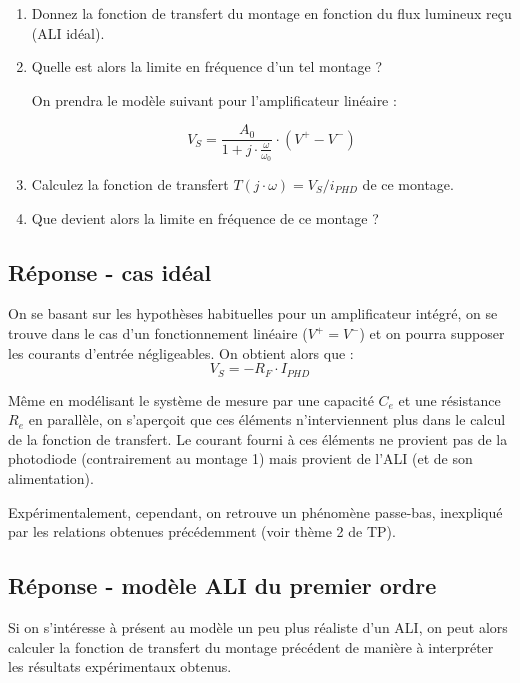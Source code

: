 \begin{enumerate}
	\item Donnez la fonction de transfert du montage en fonction du flux lumineux reçu (ALI idéal).
	\item Quelle est alors la limite en fréquence d'un tel montage ?
	
	\bigskip
	
	On prendra le modèle suivant pour l'amplificateur linéaire :

$$V_S = \frac{A_0}{1 + j \cdot \frac{\omega}{\omega_0}} \cdot (V^+ - V^-)$$
	
	\item Calculez la fonction de transfert $T(j\cdot \omega) = V_S /  i_{PHD}$ de ce montage.
	\item Que devient alors la limite en fréquence de ce montage ?
\end{enumerate}


\subsection*{Réponse - cas idéal}

On se basant sur les hypothèses habituelles pour un amplificateur intégré, on se trouve dans le cas d'un fonctionnement linéaire ($V^+ = V^-$) et on pourra supposer les courants d'entrée négligeables. On obtient alors que : $$\boxed{V_S = -R_F \cdot I_{PHD}}$$

\qquad

Même en modélisant le système de mesure par une capacité $C_e$ et une résistance $R_e$ en parallèle, on s'aperçoit que ces éléments n'interviennent plus dans le calcul de la fonction de transfert. Le courant fourni à ces éléments ne provient pas de la photodiode (contrairement au montage 1) mais provient de l'ALI (et de son alimentation).

\qquad

Expérimentalement, cependant, on retrouve un phénomène passe-bas, inexpliqué par les relations obtenues précédemment (voir thème 2 de TP).


\subsection*{Réponse - modèle ALI du premier ordre}

Si on s'intéresse à présent au modèle un peu plus réaliste d'un ALI, on peut alors calculer la fonction de transfert du montage précédent de manière à interpréter les résultats expérimentaux obtenus.

